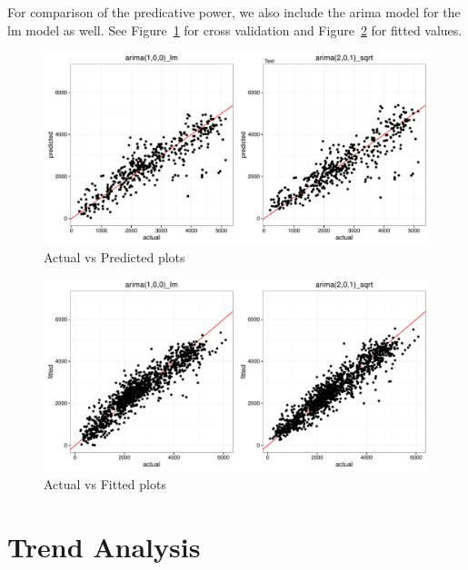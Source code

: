 \documentclass [11pt, proquest] {uwthesis}[2015/03/03]
\begin{document}
For comparison of the predicative power, we also include the arima model for the lm model as well. See Figure~\ref{fig:avp_arima1} for cross validation and Figure~\ref{fig:avp_arima2} for fitted values.


\begin{figure}
   \includegraphics[width=1\textwidth]{figures/actualvspred_arima} 
  \caption{Actual vs Predicted plots}
  \label{fig:avp_arima1}
\end{figure}

\begin{figure}
   \includegraphics[width=1\textwidth]{figures/actualvsfit_arima.pdf} 
  \caption{Actual vs Fitted plots}
  \label{fig:avp_arima2}
\end{figure}

\newpage
\thispagestyle{empty}
\mbox{}


\section{Trend Analysis}
\end{document}
